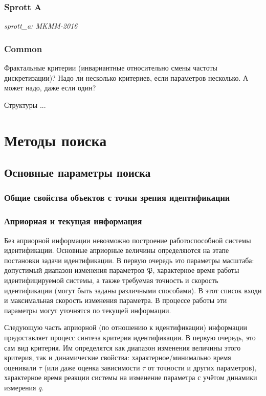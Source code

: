 \documentclass[a4paper,12pt]{article}
\newcommand{\LinkRef}[1]{ \textit{#1} }
\begin{document}
\FloatBarrier
\subsubsection{Sprott A}

\LinkRef{
  sprott\_a: MKMM-2016
}


\FloatBarrier
\subsubsection{Common}

Фрактальные критерии (инвариантные относительно смены частоты дискретизации)?
Надо ли несколько критериев, если параметров несколько.
А может надо, даже если один?

Структуры ...



\FloatBarrier
\section{Методы поиска}

\subsection{Основные параметры поиска}


\subsubsection{Общие свойства объектов с точки зрения идентификации}

\subsubsection{Априорная и текущая информация}

Без априорной информации невозможно построение
работоспособной системы идентификации. Основные
априорные величины определяются на этапе постановки
задачи идентификации. В первую очередь это
параметры масштаба: допустимый диапазон
изменения параметров \( \mathfrak{P}\),
характерное время работы
идентифицируемой системы, а также
требуемая точность и скорость идентификации
(могут быть заданы различными способами).
В этот список входи и максимальная скорость изменения параметра.
В процессе работы эти параметры могут уточнятся по текущей информации.

Следующую часть априорной (по отношению к идентификации) информации
предоставляет процесс синтеза критерия идентификации.
В первую очередь, это сам вид критерия. Им определятся
как диапазон изменения величины этого критерия, так и
динамические свойства: характерное/минимально время
оценивали \(\tau\) (или даже оценка зависимости $\tau$ от точности и других параметров),
характерное время реакции системы на изменение
параметра с учётом динамики измерения \(q\).
\end{document}

